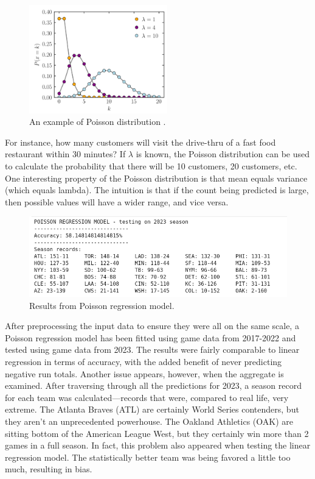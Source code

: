 \documentclass{paper}
\begin{document}
\begin{figure}[H]
  \centering
  \includegraphics[width=6cm]{fig13}
  \caption{An example of Poisson distribution \cite{poisreg}.}
\end{figure}

For instance, how many customers will visit the drive-thru of a fast food restaurant within 30 minutes? If $\lambda$ is known, the Poisson distribution can be used to calculate the probability that there will be 10 customers, 20 customers, etc. One interesting property of the Poisson distribution is that mean equals variance (which equals lambda). The intuition is that if the count being predicted is large, then possible values will have a wider range, and vice versa.

\begin{figure}[H]
  \centering
  \includegraphics[width=13cm]{fig5}
  \caption{Results from Poisson regression model.}
\end{figure}

After preprocessing the input data to ensure they were all on the same scale, a Poisson regression model has been fitted using game data from 2017-2022 and tested using game data from 2023. The results were fairly comparable to linear regression in terms of accuracy, with the added benefit of never predicting negative run totals. Another issue appears, however, when the aggregate is examined. After traversing through all the predictions for 2023, a season record for each team was calculated---records that were, compared to real life, very extreme. The Atlanta Braves (ATL) are certainly World Series contenders, but they aren't an unprecedented powerhouse. The Oakland Athletics (OAK) are sitting bottom of the American League West, but they certainly win more than 2 games in a full season. In fact, this problem also appeared when testing the linear regression model. The statistically better team was being favored a little too much, resulting in bias.
\end{document}
